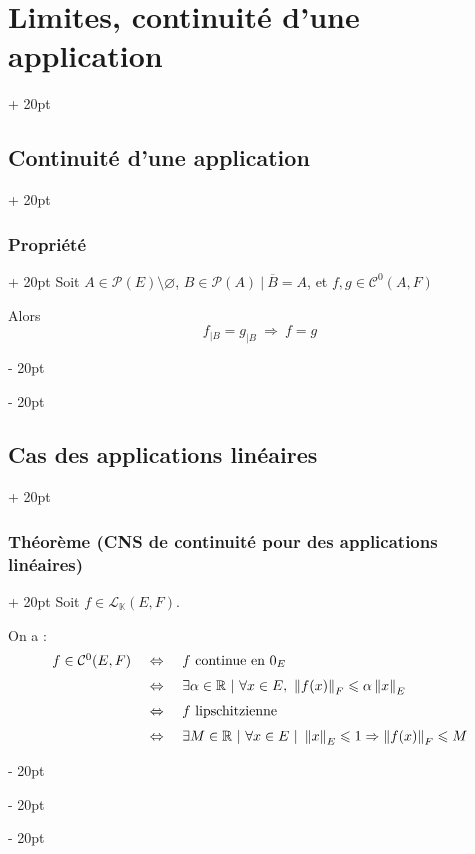 \documentclass[a4paper, 12pt, twoside]{article}
\newcommand{\R}{\mathbb{R}} %
\newcommand{\K}{\mathbb K}
\newcommand{\cj}[1]{\overline{#1}} %
\newcommand{\norm}[1]{\left\lVert #1 \right\rVert}
\newcommand{\ssi}{\ \Leftrightarrow \ }
\renewcommand{\le}{\leqslant}
\newcommand{\ind}[1][20pt]{\advance\leftskip + #1}
\newcommand{\deind}[1][20pt]{\advance\leftskip - #1}
\newenvironment{indt}[2][20pt]{#2 \par \ind[#1]}{\par \deind} %
\begin{document}
\begin{indt}{\section{Limites, continuité d'une application}}
\begin{indt}{\subsection{Continuité d'une application}}
            \vspace{12pt}
            
            \begin{indt}{\subsubsection{Propriété}}
                Soit $A \in \mathcal P(E) \setminus \varnothing$, $B \in \mathcal P(A)\ |\ \cj B = A$, et $f, g \in \mathcal C^0(A, F)$

                Alors
                \[
                    f_{|B} = g_{|B}\
                    \Rightarrow\
                    f = g
                \]
            \end{indt}
        \end{indt}

        \vspace{12pt}
        
        \begin{indt}{\subsection{Cas des applications linéaires}}
            \begin{indt}{\subsubsection{Théorème (CNS de continuité pour des applications linéaires)}}
                Soit $f \in \mathcal L_\K(E, F)$.

                On a :
                \[
                    \begin{array}{rcl}
                        f \in \mathcal C^0(E, F)
                        &\ssi&
                        f\ \text{continue en}\ 0_E
                        \vspace{6pt}
                        \\
                        &\ssi&
                        \exists \alpha \in \R\ |\ \forall x \in E,\ \norm{f(x)}_F \le \alpha \norm x _E
                        \vspace{6pt}
                        \\
                        &\ssi&
                        f\ \text{lipschitzienne}
                        \vspace{6pt}
                        \\
                        &\ssi&
                        \exists M \in \R\ |\ \forall x \in E\ |\
                        \norm x _E \le 1 \Rightarrow \norm{f(x)}_F \le M
                    \end{array}
                \]


\end{indt}
\end{indt}
\end{indt}
\end{document}
